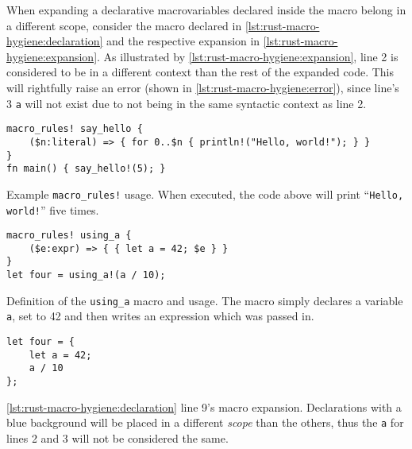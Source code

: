 When expanding a declarative macro\footnotemark variables declared inside the macro belong in a different scope,
consider the macro declared in \autoref{lst:rust-macro-hygiene:declaration} and
the respective expansion in \autoref{lst:rust-macro-hygiene:expansion}.
As illustrated by \autoref{lst:rust-macro-hygiene:expansion},
line 2 is considered to be in a different context than the rest of the expanded code.
This will rightfully raise an error (shown in \autoref{lst:rust-macro-hygiene:error}),
since line's 3 \texttt{a} will not exist due to not being in the same syntactic context as line 2.


\begin{listing}
    \centering
    \begin{verbatim}
macro_rules! say_hello {
    ($n:literal) => { for 0..$n { println!("Hello, world!"); } }
}
fn main() { say_hello!(5); }
    \end{verbatim}
    \caption{Example \texttt{macro\_rules!} usage.
        When executed, the code above will print “\texttt{Hello, world!}” five times.}
    \label{lst:rust-macro-rules}
\end{listing}


\begin{listing}
    \begin{verbatim}
macro_rules! using_a {
    ($e:expr) => { { let a = 42; $e } }
}
let four = using_a!(a / 10);
    \end{verbatim}
    \caption{
        Definition of the \texttt{using\_a} macro and usage.
        The macro simply declares a variable \texttt{a},
        set to 42 and then writes an expression which was passed in.
    }
    \label{lst:rust-macro-hygiene:declaration}
\end{listing}

\begin{listing}
    \begin{verbatim}
let four = {
    let a = 42;
    a / 10
};
    \end{verbatim}
    \caption{
        \autoref{lst:rust-macro-hygiene:declaration} line 9's macro expansion.
        Declarations with a blue background will be placed in a different \emph{scope} than the others,
        thus the \texttt{a} for lines 2 and 3 will not be considered the same.
    }
    \label{lst:rust-macro-hygiene:expansion}
\end{listing}

